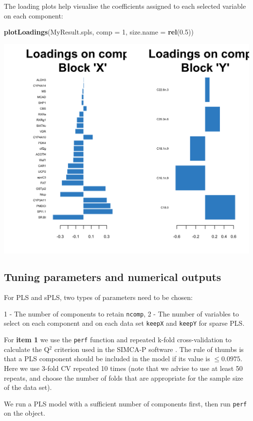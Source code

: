\documentclass[]{book}
\newenvironment{Shaded}{\begin{snugshade}}{\end{snugshade}}
\newcommand{\KeywordTok}[1]{\textcolor[rgb]{0.13,0.29,0.53}{\textbf{#1}}}
\newcommand{\DataTypeTok}[1]{\textcolor[rgb]{0.13,0.29,0.53}{#1}}
\newcommand{\DecValTok}[1]{\textcolor[rgb]{0.00,0.00,0.81}{#1}}
\newcommand{\FloatTok}[1]{\textcolor[rgb]{0.00,0.00,0.81}{#1}}
\newcommand{\NormalTok}[1]{#1}
\theoremstyle{definition}
\theoremstyle{definition}
\theoremstyle{definition}
\theoremstyle{remark}
\begin{document}
The loading plots help visualise the coefficients assigned to each
selected variable on each component:

\begin{Shaded}
\begin{Highlighting}[]
\KeywordTok{plotLoadings}\NormalTok{(MyResult.spls, }\DataTypeTok{comp =} \DecValTok{1}\NormalTok{, }\DataTypeTok{size.name =} \KeywordTok{rel}\NormalTok{(}\FloatTok{0.5}\NormalTok{))}
\end{Highlighting}
\end{Shaded}

\begin{center}\includegraphics[width=0.5\linewidth]{Figures/unnamed-chunk-10-1} \end{center}

\subsection{Tuning parameters and numerical outputs}\label{tuning:PLS}

For PLS and sPLS, two types of parameters need to be chosen:

1 - The number of components to retain \texttt{ncomp}, 2 - The number of
variables to select on each component and on each data set
\texttt{keepX} and \texttt{keepY} for sparse PLS.

For \textbf{item 1} we use the \texttt{perf} function and repeated
k-fold cross-validation to calculate the Q\(^2\) criterion used in the
SIMCA-P software \citep{Ume96}. The rule of thumbs is that a PLS
component should be included in the model if its value is
\(\leq 0.0975\). Here we use 3-fold CV repeated 10 times (note that we
advise to use at least 50 repeats, and choose the number of folds that
are appropriate for the sample size of the data set).

We run a PLS model with a sufficient number of components first, then
run \texttt{perf} on the object.
\end{document}
